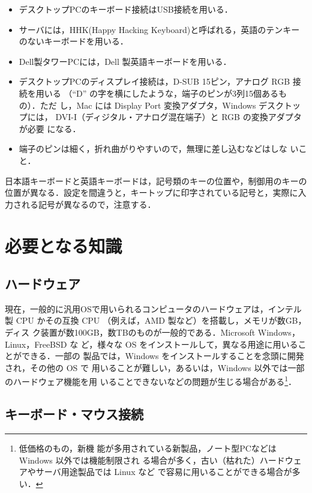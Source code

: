 \begin{itemize}
 \item デスクトップPCのキーボード接続はUSB接続を用いる．
 \item サーバには，HHK(Happy Hacking Keyboard)と呼ばれる，英語のテンキー
       のないキーボードを用いる．
 \item Dell製タワーPCには，Dell 製英語キーボードを用いる．
 \item デスクトップPCのディスプレイ接続は，D-SUB 15ピン，アナログ RGB 接続を用いる
       （``D'' の字を横にしたような，端子のピンが3列15個あるもの）．ただ
       し，Mac には Display Port 変換アダプタ，Windows デスクトップには，
       DVI-I（ディジタル・アナログ混在端子）と RGB の変換アダプタが必要
       になる．
 \item 端子のピンは細く，折れ曲がりやすいので，無理に差し込むなどはしな
       いこと．
\end{itemize}

日本語キーボードと英語キーボードは，記号類のキーの位置や，制御用のキーの
位置が異なる．設定を間違うと，キートップに印字されている記号と，実際に入
力される記号が異なるので，注意する．

\section{必要となる知識}

\subsection{ハードウェア}

現在，一般的に汎用OSで用いられるコンピュータのハードウェアは，インテル製
CPU かその互換 CPU （例えば，AMD 製など）を搭載し，メモリが数GB，ディス
ク装置が数100GB，数TBのものが一般的である．Microsoft Windows，Linux，FreeBSD な
ど，様々な OS をインストールして，異なる用途に用いることができる．一部の
製品では，Windows をインストールすることを念頭に開発され，その他の OS で
用いることが難しい，あるいは，Windows 以外では一部のハードウェア機能を用
いることできないなどの問題が生じる場合がある\footnote{低価格のもの，新機
能が多用されている新製品，ノート型PCなどは Windows 以外では機能制限され
る場合が多く，古い（枯れた）ハードウェアやサーバ用途製品では Linux など
で容易に用いることができる場合が多い．}．

\subsection{キーボード・マウス接続}


